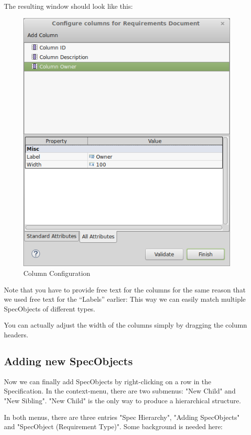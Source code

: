 The resulting window should look like this:

\begin{figure}[h!]
\centering      
\includegraphics[width=0.8\linewidth]{../rmf-images/columnconfig.png}      
\caption{Column Configuration}
\label{fig:column_configuration}
\end{figure}

Note that you have to provide free text for the columns for the same
reason that we used free text for the ``Labels'' earlier: This way we can
easily match multiple SpecObjects of different types.

You can actually adjust the width of the columns simply by dragging the
column headers.

\subsection{Adding new SpecObjects}

Now we can finally add SpecObjects by right-clicking on a row in the
Specification.  In the context-menu, there are two submenus: "New
Child" and "New Sibling".  "New Child" is the only way to produce a
hierarchical structure.

In both menus, there are three entries "Spec Hierarchy", "Adding
SpecObjects" and "SpecObject (Requirement Type)".  Some background is
needed here:

